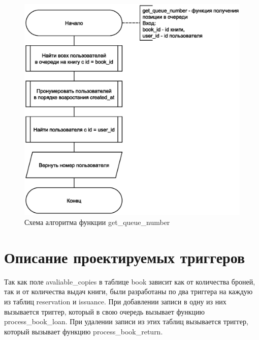 \begin{figure}[H]
	\centering
	\includegraphics[scale=0.5]{img/func_3.eps}
	\caption{Схема алгоритма функции get\_queue\_number}
	\label{fig:func_3}
\end{figure}


\section{Описание проектируемых триггеров}
Так как поле avaliable\_copies в таблице book зависит как от количества броней, так и от количества выдач книги, были разработаны по два триггера на каждую из таблиц reservation и issuance. При добавлении записи в одну из них вызывается триггер, который в свою очередь вызывает функцию process\_book\_loan. При удалении записи из этих таблиц вызывается триггер, который вызывает функцию process\_book\_return.


